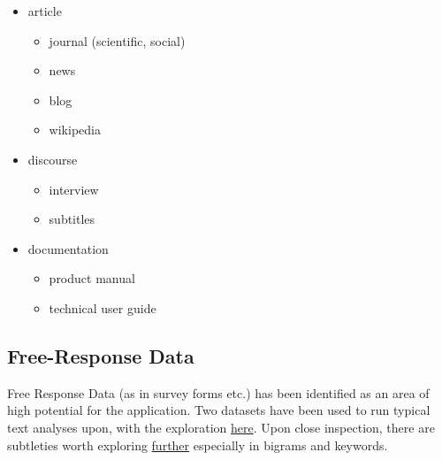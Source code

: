 \documentclass[11pt]{article}
\begin{document}
\begin{itemize}
\item article
\begin{itemize}
\item journal (scientific, social)
\item news
\item blog
\item wikipedia
\end{itemize}
\item discourse
\begin{itemize}
\item interview
\item subtitles
\end{itemize}
\item documentation
\begin{itemize}
\item product manual
\item technical user guide
\end{itemize}
\end{itemize}

\subsection{Free-Response Data}
\label{sec:org7489ee5}
Free Response Data (as in survey forms etc.) has been identified as an
area of high potential for the application. Two datasets have been
used to run typical text analyses upon, with the exploration \href{free-response.Rmd}{here}.
Upon close inspection, there are subtleties worth exploring \href{further-free-response.org}{further}
especially in bigrams and keywords.
\end{document}
